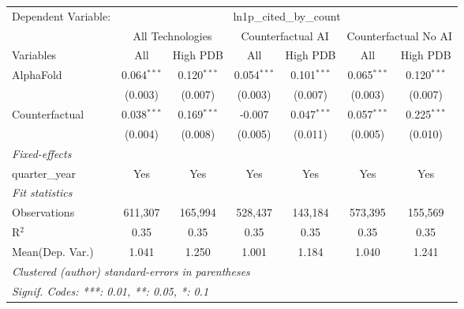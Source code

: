 \begingroup
\centering
\begin{tabular}{lcccccc}
   \tabularnewline \midrule \midrule
   Dependent Variable: & \multicolumn{6}{c}{ln1p\_cited\_by\_count}\\
 & \multicolumn{2}{c}{All Technologies} & \multicolumn{2}{c}{Counterfactual AI} & \multicolumn{2}{c}{Counterfactual No AI} \\
\cmidrule(lr){1-1}\cmidrule(lr){2-3} \cmidrule(lr){4-5} \cmidrule(lr){6-7}
Variables & \multicolumn{1}{c}{All} & \multicolumn{1}{c}{High PDB} & \multicolumn{1}{c}{All} & \multicolumn{1}{c}{High PDB} & \multicolumn{1}{c}{All} & \multicolumn{1}{c}{High PDB} \\
\cmidrule(lr){1-1}\cmidrule(lr){2-2} \cmidrule(lr){3-3} \cmidrule(lr){4-4} \cmidrule(lr){5-5} \cmidrule(lr){6-6} \cmidrule(lr){7-7}
   AlphaFold      & 0.064$^{***}$ & 0.120$^{***}$ & 0.054$^{***}$ & 0.101$^{***}$ & 0.065$^{***}$ & 0.120$^{***}$\\   
                  & (0.003)       & (0.007)       & (0.003)       & (0.007)       & (0.003)       & (0.007)\\   
   Counterfactual & 0.038$^{***}$ & 0.169$^{***}$ & -0.007        & 0.047$^{***}$ & 0.057$^{***}$ & 0.225$^{***}$\\   
                  & (0.004)       & (0.008)       & (0.005)       & (0.011)       & (0.005)       & (0.010)\\   
   \midrule
   \emph{Fixed-effects}\\
   quarter\_year  & Yes           & Yes           & Yes           & Yes           & Yes           & Yes\\  
   \midrule
   \emph{Fit statistics}\\
   Observations   & 611,307       & 165,994       & 528,437       & 143,184       & 573,395       & 155,569\\  
   R$^2$          & 0.35          & 0.35          & 0.35          & 0.35          & 0.35          & 0.35\\  
Mean(Dep. Var.) & 1.041 & 1.250 & 1.001 & 1.184 & 1.040 & 1.241 \\
   \midrule \midrule
   \multicolumn{7}{l}{\emph{Clustered (author) standard-errors in parentheses}}\\
   \multicolumn{7}{l}{\emph{Signif. Codes: ***: 0.01, **: 0.05, *: 0.1}}\\
\end{tabular}
\par\endgroup
